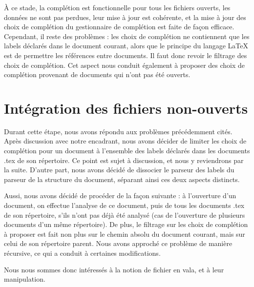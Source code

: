 \documentclass[a4paper,11pt]{report}
\begin{document}
À ce stade, la complétion est fonctionnelle pour tous les fichiers ouverts, les données ne sont pas perdues, leur mise à jour est cohérente, et la mise à jour des choix de complétion du gestionnaire de complétion est faite de façon efficace. %
Cependant, il reste des problèmes : les choix de complétion ne contiennent que les labels déclarés dans le document courant, alors que le principe du langage \LaTeX{} est de permettre les références entre documents. Il faut donc revoir le filtrage des choix de complétion. Cet aspect nous conduit également à proposer des choix de complétion provenant de documents qui n'ont pas été ouverts.

\section{Intégration des fichiers non-ouverts}

Durant cette étape, nous avons répondu aux problèmes précédemment cités. Après discussion avec notre encadrant, nous avons décider de limiter les choix de complétion pour un document à l'ensemble des labels déclarés dans les documents .tex de son répertoire. Ce point est sujet à discussion, et nous y reviendrons par la suite. D'autre part, nous avons décidé de dissocier le parseur des labels du parseur de la structure du document, séparant ainsi ces deux aspects distincts.

Aussi, nous avons décidé de procéder de la façon suivante : à l'ouverture d'un document, on effectue l'analyse de ce document, puis de tous les documents .tex de son répertoire, s'ils n'ont pas déjà été analysé (cas de l'ouverture de plusieurs documents d'un même répertoire). De plus, le filtrage sur les choix de complétion à proposer est fait non plus sur le chemin absolu du document courant, mais sur celui de son répertoire parent. Nous avons approché ce problème de manière récursive, ce qui a conduit à certaines modifications.

Nous nous sommes donc intéressés à la notion de fichier en vala, et à leur manipulation.
\end{document}
